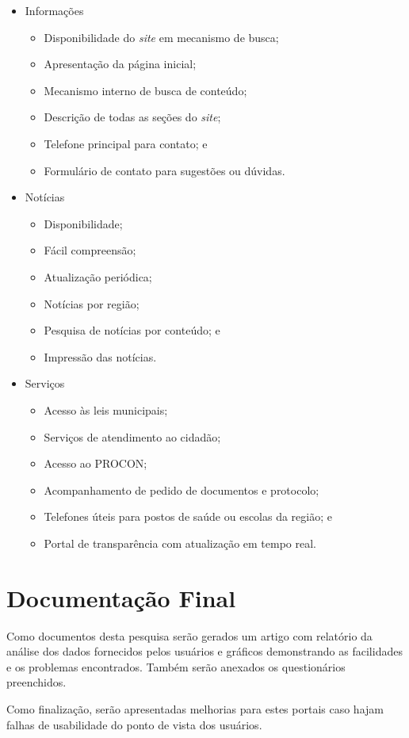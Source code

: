 \documentclass{article}
\begin{document}
\begin{itemize}
  \item Informações
  \begin{itemize}
    \item Disponibilidade do \textit{site} em mecanismo de busca;
    \item Apresentação da página inicial;
    \item Mecanismo interno de busca de conteúdo;
    \item Descrição de todas as seções do \textit{site};
    \item Telefone principal para contato; e
    \item Formulário de contato para sugestões ou dúvidas.
  \end{itemize}
  \item Notícias
  \begin{itemize}
    \item Disponibilidade;
    \item Fácil compreensão;
    \item Atualização periódica;
    \item Notícias por região;
    \item Pesquisa de notícias por conteúdo; e
    \item Impressão das notícias.
  \end{itemize}
  \item Serviços
  \begin{itemize}
    \item Acesso às leis municipais;
    \item Serviços de atendimento ao cidadão;
    \item Acesso ao PROCON;
    \item Acompanhamento de pedido de documentos e protocolo;
    \item Telefones úteis para postos de saúde ou escolas da região; e
    \item Portal de transparência com atualização em tempo real.
  \end{itemize}
\end{itemize}

\section{Documentação Final}

Como documentos desta pesquisa serão gerados um artigo com relatório da análise
dos dados fornecidos pelos usuários e gráficos demonstrando as facilidades e os
problemas encontrados. Também serão anexados os questionários preenchidos.

Como finalização, serão apresentadas melhorias para estes portais caso hajam
falhas de usabilidade do ponto de vista dos usuários.
\end{document}
